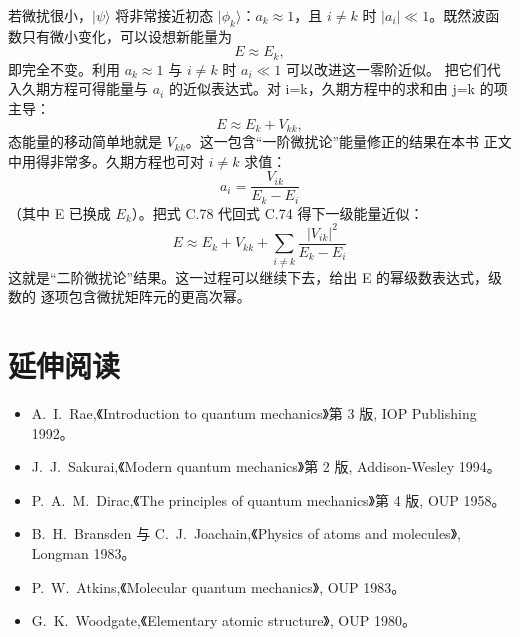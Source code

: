若微扰很小，$|\psi\rangle$ 将非常接近初态 $|\phi_k\rangle$：$a_k\approx1$，且
$i\neq k$ 时 $|a_i|\ll1$。既然波函数只有微小变化，可以设想新能量为
\begin{equation*}
E \approx E_k,\tag{C.76}
\end{equation*}
即完全不变。利用 $a_k\approx1$ 与 $i\neq k$ 时 $a_i\ll1$ 可以改进这一零阶近似。
把它们代入久期方程可得能量与 $a_i$ 的近似表达式。对 i=k，久期方程中的求和由
j=k 的项主导：
\begin{equation*}
E \approx E_k + V_{kk},\tag{C.77}
\end{equation*}
态能量的移动简单地就是 $V_{kk}$。这一包含“一阶微扰论”能量修正的结果在本书
正文中用得非常多。久期方程也可对 $i\neq k$ 求值：
\begin{equation*}
a_i = \frac{V_{ik}}{E_k-E_i}\tag{C.78}
\end{equation*}
（其中 E 已换成 $E_k$）。把式 C.78 代回式 C.74 得下一级能量近似：
\begin{equation*}
E \approx E_k + V_{kk} + \sum_{i\neq k}\frac{|V_{ik}|^{2}}{E_k-E_i}\tag{C.79}
\end{equation*}
这就是“二阶微扰论”结果。这一过程可以继续下去，给出 E 的幂级数表达式，级数的
逐项包含微扰矩阵元的更高次幂。

\section*{延伸阅读}

\begin{itemize}[itemsep=0.2em]
\item A.~I.~Rae,《Introduction to quantum mechanics》第 3 版, IOP Publishing
1992。
\item J.~J.~Sakurai,《Modern quantum mechanics》第 2 版, Addison-Wesley 1994。
\item P.~A.~M.~Dirac,《The principles of quantum mechanics》第 4 版, OUP 1958。
\item B.~H.~Bransden 与 C.~J.~Joachain,《Physics of atoms and molecules》,
Longman 1983。
\item P.~W.~Atkins,《Molecular quantum mechanics》, OUP 1983。
\item G.~K.~Woodgate,《Elementary atomic structure》, OUP 1980。
\end{itemize}
